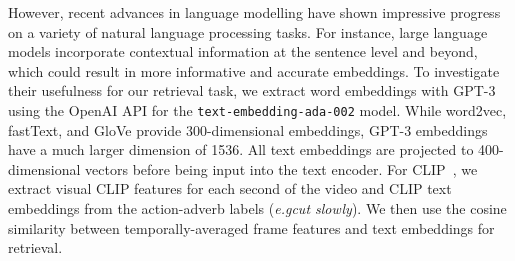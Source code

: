 \documentclass[table]{bmvc2k}
\def\eg{\emph{e.g}\bmvaOneDot}
\begin{document}
However, recent advances in language modelling have shown impressive progress on a variety of natural language processing tasks. For instance, large language models incorporate contextual information at the sentence level and beyond, which could result in more informative and accurate embeddings. 
To investigate their usefulness for our retrieval task, we extract word embeddings with GPT-3~\cite{gpt3} using the OpenAI API for the \texttt{text-embedding-ada-002} model. While word2vec, fastText, and GloVe provide 300-dimensional embeddings, GPT-3 embeddings have a much larger dimension of 1536. All text embeddings are projected to 400-dimensional vectors before being input into the text encoder. For CLIP~\cite{radford2021learning}, we extract visual CLIP features for each second of the video and CLIP text embeddings from the action-adverb labels (\eg \textit{cut slowly}). We then use the cosine similarity between temporally-averaged frame features and text embeddings for retrieval. 


\begin{table}[t]
\centering
\begin{center}
\end{center}

\caption{Statistics of our dataset splits for the retrieval of unseen adverb-action compositions on the MSR-VTT Adverbs and ActivityNet Adverbs datasets. Statistics are also provided for the VATEX Adverbs dataset for features from~\cite{moltisanti2023learning}.
}
\label{tab:supp_dataset-statistics}
\end{table}
\end{document}
